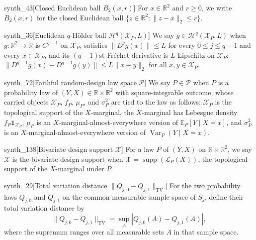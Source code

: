 \documentclass[11pt]{article}
\begin{document}
\begin{definitionv}{synth_43}[Closed Euclidean ball $B_2(x,r)$]
For $x\in\mathbb R^2$ and $r\geq0$, we write $B_2(x,r)$ for the closed Euclidean ball $\{z\in\mathbb R^2:\lVert z-x\rVert_2\leq r\}$.
\end{definitionv}

\begin{definitionv}{synth_36}[Euclidean \(q\)-Hölder ball \(\mathcal H^q(\mathcal X_P,L)\)]
We say \(g\in\mathcal H^q(\mathcal X_P,L)\) when \(g:\mathbb R^2\to\mathbb R\) is \(C^{q-1}\) on \(\mathcal X_P\), satisfies \(\lVert D^j g(x)\rVert\leq L\) for every \(0\leq j\leq q-1\) and every \(x\in\mathcal X_P\), and its \((q-1)\)st Fréchet derivative is \(L\)-Lipschitz on \(\mathcal X_P\): \(\lVert D^{q-1}g(x)-D^{q-1}g(y)\rVert\leq L\lVert x-y\rVert_2\) for all \(x,y\in\mathcal X_P\).
\end{definitionv}

\begin{definitionv}{synth_72}[Faithful random-design law space \(\mathcal P\)]
We say \(P\in\mathcal P\) when \(P\) is a probability law of \((Y,X)\in\mathbb R\times\mathbb R^2\) with square-integrable outcome, whose carried objects \(\mathcal X_P\), \(f_P\), \(\mu_P\), and \(\sigma_P^2\) are tied to the law as follows: \(\mathcal X_P\) is the topological support of the \(X\)-marginal, the \(X\)-marginal has Lebesgue density \(f_P\mathbf 1_{\mathcal X_P}\), \(\mu_P\) is an \(X\)-marginal-almost-everywhere version of \(\mathbb E_P[Y\mid X=x]\), and \(\sigma_P^2\) is an \(X\)-marginal-almost-everywhere version of \(\operatorname{Var}_P(Y\mid X=x)\).
\end{definitionv}

\begin{definitionv}{synth_138}[Bivariate design support \(\mathcal X\)]
For a law \(P\) of \((Y,X)\) on \(\mathbb R\times\mathbb R^2\), we say \(\mathcal X\) is the bivariate design support when \(\mathcal X=\operatorname{supp}(\mathcal L_P(X))\), the topological support of the \(X\)-marginal under \(P\).
\end{definitionv}

\begin{definitionv}{synth_29}[Total variation distance $\lVert Q_{j,0}-Q_{j,1}\rVert_{\mathrm{TV}}$]
For the two probability laws $Q_{j,0}$ and $Q_{j,1}$ on the common measurable sample space of $S_j$, define their total variation distance by \[\lVert Q_{j,0}-Q_{j,1}\rVert_{\mathrm{TV}}=\sup_{A}\left|Q_{j,0}(A)-Q_{j,1}(A)\right|,\] where the supremum ranges over all measurable sets $A$ in that sample space.
\end{definitionv}
\end{document}
